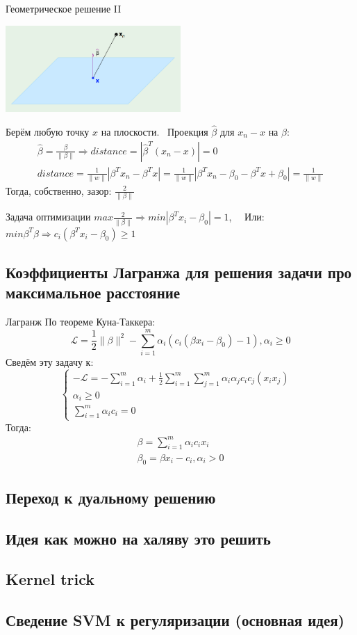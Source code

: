 \documentclass[14pt, fleqn, xcolor={dvipsnames, table}]{beamer}
\begin{document}
\begin{frame}{Геометрическое решение II}
\begin{center}
\includegraphics[width=0.5\textwidth]{SVM_3.png}
\end{center}
\small
Берём любую точку $x$ на плоскости. \
Проекция $\hat{\beta}$ для $x_n - x$ на $\beta$: \
$$\begin{array}{l}
\hat{\beta} = \frac{\beta}{\|\beta\|} \Rightarrow distance = |\hat{\beta}^T (x_n - x)| = 0 \\
distance = \frac{1}{\|w\|} |\beta^Tx_n - \beta^Tx | = \frac{1}{\|w\|} |\beta^Tx_n - \beta_0 - \beta^Tx + \beta_0 | = \frac{1}{\|w\|}
\end{array}
$$
Тогда, собственно, зазор: $\frac{2}{\|\beta\|}$
\end{frame}

\begin{frame}{Задача оптимизации}
$max\frac{2}{\|\beta\|} \Rightarrow min|\beta^Tx_i - \beta_0| = 1$, \
\
Или: \
\
$min\beta^T\beta \Rightarrow c_i(\beta^Tx_i - \beta_0) \ge 1$
\end{frame}



\subsection{Коэффициенты Лагранжа для решения задачи про максимальное расстояние}
\begin{frame}{Лагранж}
По теореме Куна-Таккера: \
$$
\mathcal{L} = \frac{1}{2}\|\beta\|^2 - \sum_{i=1}^m\alpha_i(c_i(\beta x_i - \beta_0) - 1), \alpha_i \ge 0
$$ 
Сведём эту задачу к: \
$$
\left\{  
           \begin{array}{ll}  
            -\mathcal{L} = -\sum_{i=1}^m\alpha_i + \frac{1}{2}\sum_{i=1}^m\sum_{j=1}^m\alpha_i\alpha_jc_ic_j(x_ix_j) \\  
            \alpha_i \ge 0 & \\
            \sum_{i=1}^m\alpha_ic_i = 0
           \end{array}   
           \right.
$$
Тогда: \
$$\begin{array}{l}
\beta = \sum_{i=1}^m\alpha_ic_ix_i \\
\beta_0 = \beta x_i - c_i, \alpha_i > 0
\end{array}$$
\end{frame}

\subsection{Переход к дуальному решению}
\subsection{Идея как можно на халяву это решить}
\subsection{Kernel trick}
\subsection{Сведение SVM к регуляризации (основная идея)}
\end{document}

